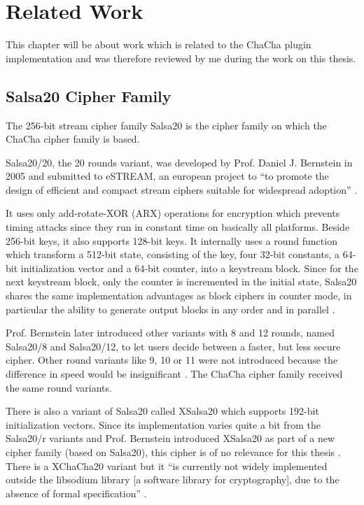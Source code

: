 \chapter{Related Work}
\label{sec:relatedWork}

This chapter will be about work which is related to the ChaCha plugin implementation and was therefore reviewed by me during the work on this thesis.

\section{Salsa20 Cipher Family}
\label{sec:salsaCipher}

The 256-bit stream cipher family Salsa20 is the cipher family on which the ChaCha cipher family is based.

Salsa20/20, the 20 rounds variant, was developed by Prof. Daniel J. Bernstein in 2005 \cite{salsaspec} and submitted to eSTREAM, an european project to ``to promote the design of efficient and compact stream ciphers suitable for widespread adoption'' \cite{estream}.

It uses only add-rotate-XOR (ARX) operations for encryption which prevents timing attacks since they run in constant time on basically all platforms. Beside 256-bit keys, it also supports 128-bit keys. It internally uses a round function which transform a 512-bit state, consisting of the key, four 32-bit constants, a 64-bit initialization vector and a 64-bit counter, into a keystream block. Since for the next keystream block, only the counter is incremented in the initial state, Salsa20 shares the same implementation advantages as block ciphers in counter mode, in particular the ability to generate output blocks in any order and in parallel \cite{salsaspec}.

Prof. Bernstein later introduced other variants with 8 and 12 rounds, named Salsa20/8 and Salsa20/12, to let users decide between a faster, but less secure cipher. Other round variants like 9, 10 or 11 were not introduced because the difference in speed would be insignificant \cite{salsa812}. The ChaCha cipher family received the same round variants. 

There is also a variant of Salsa20 called XSalsa20 which supports 192-bit initialization vectors. Since its implementation varies quite a bit from the Salsa20/r variants and Prof. Bernstein introduced XSalsa20 as part of a new cipher family (based on Salsa20), this cipher is of no relevance for this thesis \cite{xsalsa20spec}. There is a XChaCha20 variant but it ``is currently not widely implemented outside the libsodium library [a software library for cryptography], due to the absence of formal specification'' \cite{xchacha20}.

